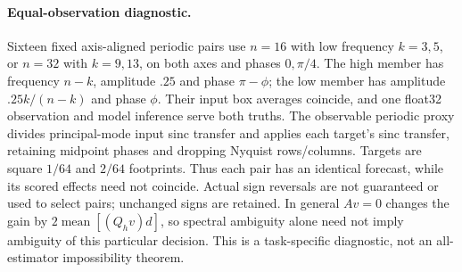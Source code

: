 \paragraph{Equal-observation diagnostic.}
Sixteen fixed axis-aligned periodic pairs use $n=16$ with low frequency $k=3,5$, or $n=32$ with $k=9,13$, on both axes and phases $0,\pi/4$. The high member has frequency $n-k$, amplitude $.25$ and phase $\pi-\phi$; the low member has amplitude $.25k/(n-k)$ and phase $\phi$. Their input box averages coincide, and one float32 observation and model inference serve both truths. The observable periodic proxy divides principal-mode input sinc transfer and applies each target's sinc transfer, retaining midpoint phases and dropping Nyquist rows/columns. Targets are square $1/64$ and $2/64$ footprints. Thus each pair has an identical forecast, while its scored effects need not coincide. Actual sign reversals are not guaranteed or used to select pairs; unchanged signs are retained. In general $Av=0$ changes the gain by $2\operatorname{mean}[(Q_hv)d]$, so spectral ambiguity alone need not imply ambiguity of this particular decision. This is a task-specific diagnostic, not an all-estimator impossibility theorem.

